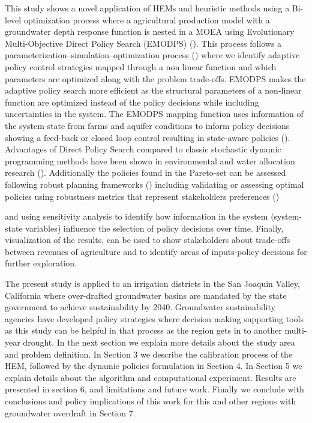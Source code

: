 \documentclass[11pt,a4paper]{article}
\begin{document}
This study shows a novel application of HEMs and heuristic methods using a Bi-level optimization process where a agricultural production model with a groundwater depth response function is nested in a MOEA using Evolutionary Multi-Objective Direct Policy Search (EMODPS) (\cite{giuliani_curses_2016}). This process follows a parameterization–simulation–optimization process (\cite{rosenstein_robot_2001,koutsoyiannis_evaluation_2003}) where we identify adaptive policy control strategies mapped through a non linear function and which parameters are optimized along with the problem trade-offs. EMODPS makes the adaptive policy search more efficient as the structural parameters of a non-linear function are optimized instead of the policy decisions while including uncertainties in the system. The EMODPS mapping function uses information of the system state from farms and aquifer conditions to inform policy decisions showing a feed-back or closed loop control resulting in state-aware policies (\cite{giuliani_curses_2016}). Advantages of Direct Policy Search compared to classic stochastic dynamic programming methods have been shown in environmental and water allocation research (\cite{quinn_direct_2017,gupta_can_2020,macian-sorribes_inferring_2020,zatarain_salazar_balancing_2017}). Additionally the policies found in the Pareto-set can be assessed following robust planning frameworks (\cite{lempert_making_2013,herman_climate_2020,kasprzyk_many_2013}) including validating or assessing optimal policies using robustness metrics that represent stakeholders preferences (\cite{mcphail_robustness_2018,herman_how_2015}) 

and using sensitivity analysis to identify how information in the system (system-state variables) influence the selection of policy decisions over time. Finally, visualization of the results, can be used to show stakeholders about trade-offs between revenues of agriculture and to identify areas of inputs-policy decisions for further exploration. 

The present study is applied to an irrigation districts in the San Joaquin Valley, California where over-drafted groundwater basins are mandated by the state government to achieve sustainability by 2040. Groundwater sustainability agencies have developed policy strategies where decision making supporting tools as this study can be helpful in that process as the region gets in to another multi-year drought. In the next section we explain more details about the study area and problem definition. In Section 3 we describe the calibration process of the HEM, followed by the dynamic policies formulation in Section 4. In Section 5 we explain details about the algorithm and computational experiment. Results are presented in section 6, and limitations and future work. Finally we conclude with conclusions and policy implications of this work for this and other regions with groundwater overdraft in Section 7.
\end{document}
